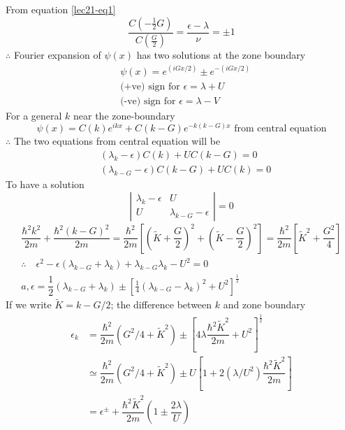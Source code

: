 From equation \eqref{lec21-eq1} 
$$
\dfrac{C\left(-\frac{1}{2}G\right)}{C\left(\frac{G}{2}\right)}=\dfrac{\epsilon-\lambda}{\nu}=\pm 1
$$
$\therefore$ Fourier expansion of $\psi(x)$ has two solutions at the zone boundary 
\begin{align*}
& \psi(x)=e^{(iGx/2)}\pm e^{-(iGx/2)}\\
&\text{(+ve) sign for } \epsilon=\lambda+U\\
&\text{(-ve) sign for } \epsilon=\lambda-V
\end{align*}
For a general $k$ near the zone-boundary
$$
\psi(x)=C(k)e^{ikx}+C(k-G)e^{-k(k-G)x}\text{ from central equation}
$$
$\therefore$ The two equations from central equation will be
\begin{align*}
& (\lambda_{k}-\epsilon)C(k)+UC(k-G)=0\\
& (\lambda_{k-G}-\epsilon)C(k-G)+UC(k)=0
\end{align*}
To have a solution
$$
\left|
\begin{array}{cc}
\lambda_{k}-\epsilon & U\\
U & \lambda_{k-G}-\epsilon
\end{array}
\right|=0
$$
\begin{gather*}
\dfrac{\hbar^{2}k^{2}}{2m}+\dfrac{\hbar^{2}(k-G)^{2}}{2m}=\dfrac{\hbar^{2}}{2m}\left[\left(\widetilde{K}+\dfrac{G}{2}\right)^{2}+\left(\widetilde{K}-\dfrac{G}{2}\right)^{2}\right]=\dfrac{\hbar^{2}}{2m}\left[\widetilde{K}^{2}+\dfrac{G^{2}}{4}\right]\\
\therefore\quad \epsilon^{2}-\epsilon (\lambda_{k-G}+\lambda_{k})+\lambda_{k-G}\lambda_{k}-U^{2}=0\\
a, \epsilon=\dfrac{1}{2}(\lambda_{k-G}+\lambda_{k})\pm \left[\frac{1}{4}(\lambda_{k-G}-\lambda_{k})^{2}+U^{2}\right]^{\frac{1}{2}}
\end{gather*}
If we write $\widetilde{K}=k-G/2$; the difference between $k$ and zone boundary
\begin{align*}
\epsilon_{k} &= \dfrac{\hbar^{2}}{2m}\left(G^{2}/4+\widetilde{K}^{2}\right)\pm \left[4\lambda \dfrac{\hbar^{2}\widetilde{K}^{2}}{2m}+U^{2}\right]^{\frac{1}{2}}\\
&\simeq \dfrac{\hbar^{2}}{2m}\left(G^{2}/4+\widetilde{K}^{2}\right)\pm U \left[1+2(\lambda/U^{2})\dfrac{\hbar^{2}\widetilde{K}^{2}}{2m}\right]\\
&= \epsilon^{\pm}+\dfrac{\hbar^{2}\widetilde{K}^{2}}{2m}\left(1\pm \dfrac{2\lambda}{U}\right)
\end{align*}
